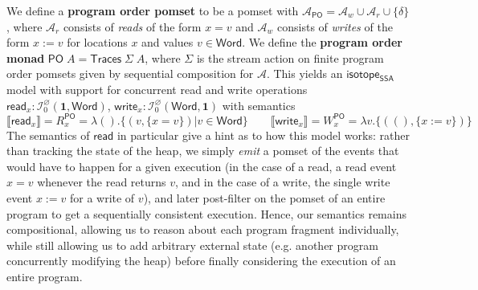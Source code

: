 \documentclass[acmsmall,screen,review]{acmart}
\newcommand{\mc}[1]{\ensuremath{\mathcal{#1}}}
\newcommand{\mb}[1]{\ensuremath{\mathbf{#1}}}
\newcommand{\ms}[1]{\ensuremath{\mathsf{#1}}}
\newcommand{\dnt}[1]{\llbracket{#1}\rrbracket}
\newcommand{\isotopessa}{\ms{isotope_{SSA}}}
\begin{document}
We define a \textbf{program order pomset} to be a pomset with \(\mc{A}_{\ms{PO}} =
\mc{A}_w \cup \mc{A}_r \cup \{\delta\}\), where \(\mc{A}_r\) consists of
\textit{reads} of the form \(x = v\) and \(\mc{A}_w\) consists of
\textit{writes} of the form \(x := v\) for locations \(x\) and values \(v \in
\ms{Word}\). We define the \textbf{program order monad} \(\ms{PO}\;A =
\ms{Traces}\;\Sigma\;A\), where \(\Sigma\) is the stream action on finite
program order pomsets given by sequential composition for \(\mc{A}\). This
yields an \isotopessa model with support for concurrent read and write
operations \(\ms{read}_x: \mc{I}^\varnothing_0(\mb{1}, \ms{Word})\),
\(\ms{write}_x: \mc{I}^\varnothing_0(\ms{Word}, \mb{1})\) with
semantics
\begin{equation}
  \dnt{\ms{read}_x} = R_x^{\ms{PO}} = \lambda (). \{(v, \{x = v\}) | v \in \ms{Word}\}
  \qquad
  \dnt{\ms{write}_x} = W_x^{\ms{PO}} =  \lambda v. \{((), \{x := v\})\}
\end{equation}
The semantics of \(\ms{read}\) in particular give a hint as to how this model
works: rather than tracking the state of the heap, we simply \textit{emit} a
pomset of the events that would have to happen for a given execution (in the
case of a read, a read event \(x = v\) whenever the read returns \(v\), and in
the case of a write, the single write event \(x := v\) for a write of \(v\)),
and later post-filter on the pomset of an entire program to get a sequentially
consistent execution. Hence, our semantics remains compositional, allowing us to
reason about each program fragment individually, while still allowing us to add
arbitrary external state (e.g. another program concurrently modifying the heap)
before finally considering the execution of an entire program.
\end{document}

